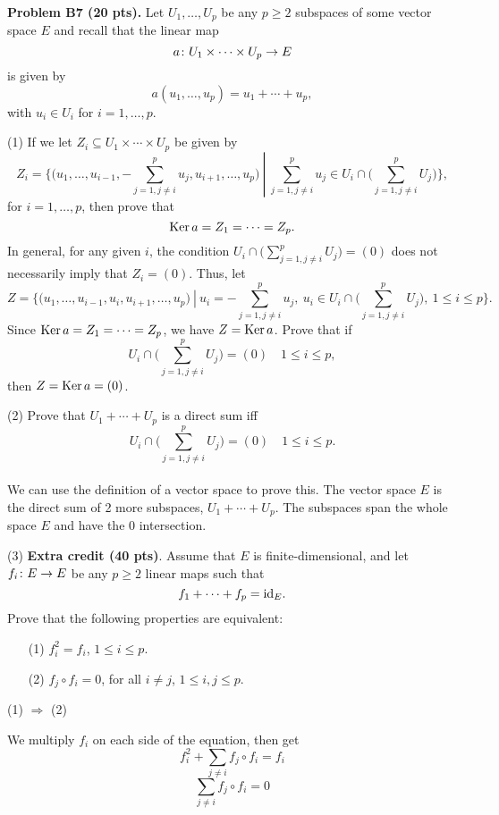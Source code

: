 \documentclass[12pt]{article}
\begin{document}
\medskip
\vspace {0.25cm}\noindent
{\bf Problem B7 (20 pts).}
Let $U_1, \ldots, U_p$ be any  $p \geq 2$  subspaces of some vector
space $E$ and recall that the linear map
\[
a\colon U_1\times \cdots \times U_p\rightarrow E
\]
is given by
\[
a(u_1, \ldots, u_p) = u_1 + \cdots + u_p,
\]
with $u_i \in U_i$ for $i = 1, \ldots, p$.

\medskip
(1)
If we let $Z_i \subseteq U_1\times \cdots \times U_p$ be given by
\[
Z_i = \left.\bigg\{\Big(u_1, \ldots, u_{i - 1}, -\sum_{j = 1, j \not= i}^p u_j, u_{i + 1}, 
\ldots, u_p\Big) \>\right|\> \sum_{j = 1, j \not= i}^p u_j  \in  
U_i \cap \bigg(\sum_{j = 1, j \not= i}^p U_j \bigg) 
\bigg\},
\]
for $i = 1, \ldots, p$, then prove that
\[
{\rm Ker}\,{a} = Z_1 = \cdots =   Z_p.
\]
In general, for any given $i$, the condition
$U_i \cap \bigg(\sum_{j = 1, j \not= i}^p U_j \bigg) =
(0)$ does not necessarily imply that $Z_i = (0)$.
Thus, let 
\[
Z = \left.\bigg\{\Big(u_1, \ldots, u_{i - 1}, u_i, u_{i + 1}, 
\ldots, u_p\Big) \>\right|\> u_i =  -\sum_{j = 1, j \not= i}^p u_j, \>
u_i   \in  
U_i \cap \bigg(\sum_{j = 1, j \not= i}^p U_j \bigg), \> 1\leq i \leq p 
\bigg\}.
\]
Since ${\rm Ker}\,{a} = Z_1 = \cdots =  Z_p$, we have $Z = {\rm Ker}\, a$.
Prove that if
\[
U_i \cap \bigg(\sum_{j = 1, j \not= i}^p U_j \bigg) = (0)
\quad 1 \leq i \leq p,
\]
then $Z = {\rm Ker}\, a = (0)$.

\medskip
(2)
Prove that $U_1 + \cdots + U_p$ is a direct sum iff
\[
U_i \cap \bigg(\sum_{j = 1, j \not= i}^p U_j \bigg) = (0)
\quad 1 \leq i \leq p.
\] \\

We can use the definition of a vector space to prove this. The vector space $E$ is the direct sum of 2 more subspaces, $U_1 + \cdots + U_p$. The subspaces span the whole space $E$ and have the ${0}$ intersection.  

\medskip\noindent
(3)
{\bf Extra credit (40 pts)\/}.
Assume that $E$ is finite-dimensional, and
let $f_i\colon E\rightarrow E$ be any 
$p\geq 2$ linear maps such that
\[
f_1 + \cdots + f_p  = {\rm id}_E.
\]
Prove that the following properties are equivalent:
\begin{enumerate}
\item[(1)]
$f_i^2 = f_i$, $1\leq i \leq p$.
\item[(2)]
$f_j \circ f_i =  0$, for all $i \not= j$, $1\leq i, j \leq p$.
\end{enumerate}

(1) $\Rightarrow$ (2) 

We multiply $f_i$ on each side of the equation, then get 
\[
f_i^2 + \sum_{j \neq i} f_j \circ f_i = f_i
\]
\[
 \sum_{j \neq i} f_j \circ f_i  = 0
\] \\
\end{document}
